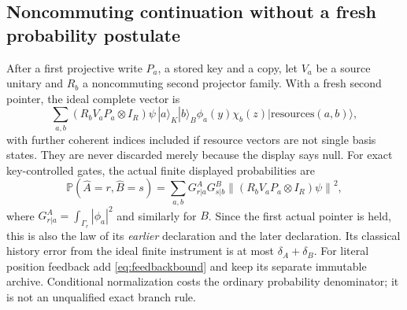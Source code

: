\documentclass[11pt]{article}
\theoremstyle{definition}\newtheorem{assumption}[theorem]{Constitutive assumption}
\theoremstyle{remark}\newtheorem{remark}[theorem]{Remark}
\newcommand{\ket}[1]{|#1\rangle}\newcommand{\bra}[1]{\langle#1|}
\newcommand{\Prb}{\mathbb P}\newcommand{\TV}{d_{\rm TV}}
\newcommand{\norm}[1]{\left\|#1\right\|}\newcommand{\pos}[1]{[#1]_+}
\begin{document}
\subsection{Noncommuting continuation without a fresh probability postulate}
After a first projective write $P_a$, a stored key and a copy, let $V_a$ be a source unitary and $R_b$ a noncommuting second projector family. With a fresh second pointer, the ideal complete vector is
\begin{equation}\label{eq:jointwave}
 \sum_{a,b}(R_bV_aP_a\otimes I_R)\psi\,
         \ket a_K\ket b_B\phi_a(y)\chi_b(z)
         \ket{\mathrm{resources}(a,b)},
\end{equation}
with further coherent indices included if resource vectors are not single basis states. They are never discarded merely because the display says null. For exact key-controlled gates, the actual finite displayed probabilities are
\begin{equation}\label{eq:noisymarks}
 \Prb(\widehat A=r,\widehat B=s)
 =\sum_{a,b}G^A_{r|a}G^B_{s|b}
                      \norm{(R_bV_aP_a\otimes I_R)\psi}^2,
\end{equation}
where $G^A_{r|a}=\int_{\Gamma_r}|\phi_a|^2$ and similarly for $B$. Since the first actual pointer is held, this is also the law of its \emph{earlier} declaration and the later declaration. Its classical history error from the ideal finite instrument is at most $\delta_A+\delta_B$. For literal position feedback add \eqref{eq:feedbackbound} and keep its separate immutable archive. Conditional normalization costs the ordinary probability denominator; it is not an unqualified exact branch rule.
\end{document}
